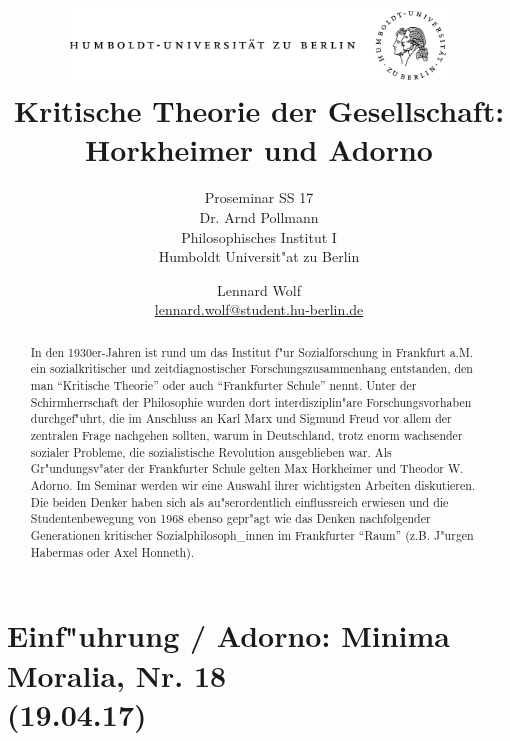 \documentclass[emulatestandardclasses]{scrartcl}
\date{\vspace{-3ex}}
\begin{document}
\title{
	\includegraphics*[width=0.75\textwidth]{ErstesSem/images/hu_logo.png}\\
	\vspace{24pt}
	Kritische Theorie der Gesellschaft: Horkheimer und Adorno}
\subtitle{Proseminar SS 17\\
          Dr. Arnd Pollmann\\
          Philosophisches Institut I \\ 
          Humboldt Universit"at zu Berlin}
\author{Lennard Wolf\\
        \small{\href{mailto:lennard.wolf@student.hu-berlin.de}{lennard.wolf@student.hu-berlin.de}}}
\maketitle
\begin{abstract}

In den 1930er-Jahren ist rund um das Institut f"ur Sozialforschung in Frankfurt a.M. ein sozialkritischer und zeitdiagnostischer Forschungszusammenhang entstanden, den man "`Kritische Theorie"' oder auch "`Frankfurter Schule"' nennt. Unter der Schirmherrschaft der Philosophie wurden dort interdisziplin"are Forschungsvorhaben durchgef"uhrt, die im Anschluss an Karl Marx und Sigmund Freud vor allem der zentralen Frage nachgehen sollten, warum in Deutschland, trotz enorm wachsender sozialer Probleme, die sozialistische Revolution ausgeblieben war. Als Gr"undungsv"ater der Frankfurter Schule gelten Max Horkheimer und Theodor W. Adorno. Im Seminar werden wir eine Auswahl ihrer wichtigsten Arbeiten diskutieren. Die beiden Denker haben sich als au"serordentlich einflussreich erwiesen und die Studentenbewegung von 1968 ebenso gepr"agt wie das Denken nachfolgender Generationen kritischer Sozialphilosoph\_innen im Frankfurter "`Raum"' (z.B. J"urgen Habermas oder Axel Honneth).

\end{abstract}
\newpage

\tableofcontents
\listoffigures
\newpage


\section{Einf"uhrung / Adorno: Minima Moralia, Nr. 18
\\(19.04.17)}
\end{document}
